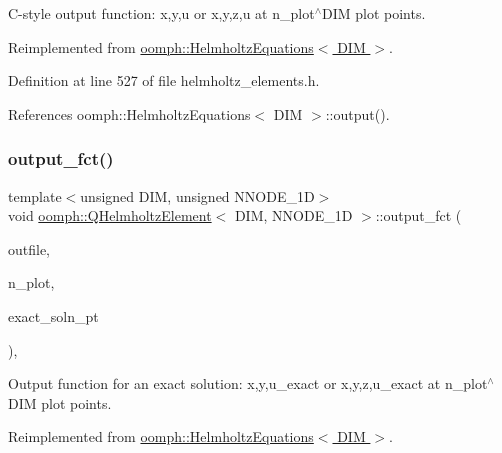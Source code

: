C-\/style output function\+: x,y,u or x,y,z,u at n\+\_\+plot$^\wedge$\+D\+IM plot points. 



Reimplemented from \hyperlink{classoomph_1_1HelmholtzEquations_a0ba883cd70dbbd5664e76b83407f1144}{oomph\+::\+Helmholtz\+Equations$<$ D\+I\+M $>$}.



Definition at line 527 of file helmholtz\+\_\+elements.\+h.



References oomph\+::\+Helmholtz\+Equations$<$ D\+I\+M $>$\+::output().

\mbox{\label{classoomph_1_1QHelmholtzElement_ae560b649d5604bfa9a49e0cd7fb37d6f}} 
\subsubsection{\texorpdfstring{output\+\_\+fct()}{output\_fct()}\hspace{0.1cm}{\footnotesize\ttfamily [1/2]}}
{\footnotesize\ttfamily template$<$unsigned D\+IM, unsigned N\+N\+O\+D\+E\+\_\+1D$>$ \\
void \hyperlink{classoomph_1_1QHelmholtzElement}{oomph\+::\+Q\+Helmholtz\+Element}$<$ D\+IM, N\+N\+O\+D\+E\+\_\+1D $>$\+::output\+\_\+fct (\begin{DoxyParamCaption}\item[{std\+::ostream \&}]{outfile,  }\item[{const unsigned \&}]{n\+\_\+plot,  }\item[{\hyperlink{classoomph_1_1FiniteElement_a690fd33af26cc3e84f39bba6d5a85202}{Finite\+Element\+::\+Steady\+Exact\+Solution\+Fct\+Pt}}]{exact\+\_\+soln\+\_\+pt }\end{DoxyParamCaption})\hspace{0.3cm}{\ttfamily [inline]}, {\ttfamily [virtual]}}



Output function for an exact solution\+: x,y,u\+\_\+exact or x,y,z,u\+\_\+exact at n\+\_\+plot$^\wedge$\+D\+IM plot points. 



Reimplemented from \hyperlink{classoomph_1_1HelmholtzEquations_a18bda8e96ef3abc2d247018592f15f56}{oomph\+::\+Helmholtz\+Equations$<$ D\+I\+M $>$}.



